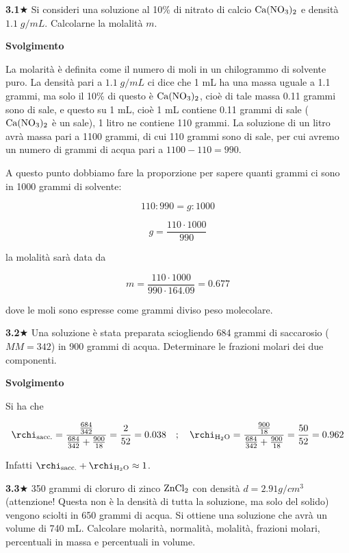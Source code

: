 \textbf{3.1}$\bigstar$ Si consideri una soluzione al 10\% di nitrato di calcio $\rm Ca(NO_3)_2$ e densità $1.1\;g/mL$. Calcolarne la molalità $m$.

\vspace{0.2cm}\large\textbf{Svolgimento}\normalsize

\vspace{0.2cm}La molarità è definita come il numero di moli in un chilogrammo di solvente puro. La densità pari a $1.1\;g/mL$ ci dice che 1 mL ha una massa uguale a 1.1 grammi, ma solo il 10\% di questo è $\rm Ca(NO_3)_2$, cioè di tale massa 0.11 grammi sono di sale, e questo su 1 mL, cioè 1 mL contiene 0.11 grammi di sale ($\rm Ca(NO_3)_2$ è un sale), 1 litro ne contiene 110 grammi. La soluzione di un litro avrà massa pari a 1100 grammi, di cui 110 grammi sono di sale, per cui avremo un numero di grammi di acqua pari a $1100-110=990$.

A questo punto dobbiamo fare la proporzione per sapere quanti grammi ci sono in 1000 grammi di solvente:

$$110:990=g:1000$$

$$g=\frac{110 \cdot 1000}{990}$$

la molalità sarà data da

$$m=\frac{110 \cdot 1000}{990 \cdot 164.09}=0.677$$

dove le moli sono espresse come grammi diviso peso molecolare.

\vspace{0.2cm}\textbf{3.2}$\bigstar$ Una soluzione è stata preparata sciogliendo 684 grammi di saccarosio ($MM=342$) in 900 grammi di acqua. Determinare le frazioni molari dei due componenti.

\vspace{0.2cm}\large\textbf{Svolgimento}\normalsize

\vspace{0.2cm}Si ha che

$$\rchi_{\text{sacc.}}=\frac{\frac{684}{342}}{\frac{684}{342} + \frac{900}{18}}=\frac{2}{52}=0.038
\quad;\quad
\rchi_{\text{H}_2\text{O}}=\frac{\frac{900}{18}}{\frac{684}{342} + \frac{900}{18}}=\frac{50}{52}=0.962$$

\vspace{0.2cm}Infatti $\rchi_{\text{sacc.}} + \rchi_{\text{H}_2\text{O}}\approx 1$.

\vspace{0.2cm}\textbf{3.3}$\bigstar$ 350 grammi di cloruro di zinco $\rm ZnCl_2$ con densità $d=2.91 g/cm^3$ (attenzione! Questa non è la densità di tutta la soluzione, ma solo del solido) vengono sciolti in 650 grammi di acqua. Si ottiene una soluzione che avrà un volume di 740 mL. Calcolare molarità, normalità, molalità, frazioni molari, percentuali in massa e percentuali in volume.

